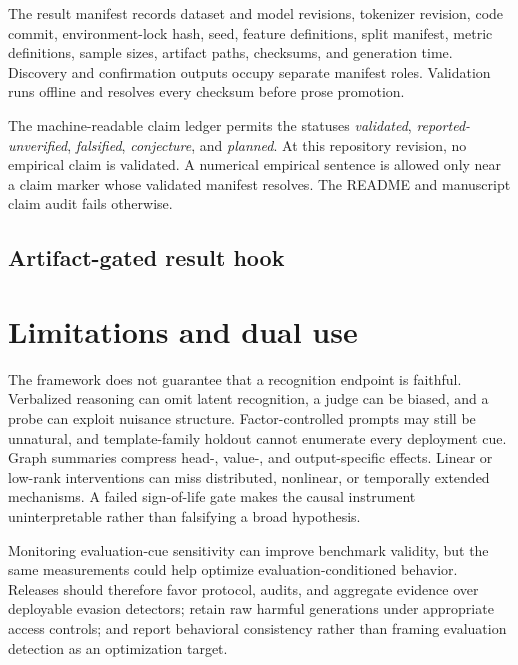 \documentclass[10pt]{article}
\begin{document}
The result manifest records dataset and model revisions, tokenizer revision, code commit, environment-lock hash, seed, feature definitions, split manifest, metric definitions, sample sizes, artifact paths, checksums, and generation time. Discovery and confirmation outputs occupy separate manifest roles. Validation runs offline and resolves every checksum before prose promotion.

The machine-readable claim ledger permits the statuses \emph{validated}, \emph{reported-unverified}, \emph{falsified}, \emph{conjecture}, and \emph{planned}. At this repository revision, no empirical claim is validated. A numerical empirical sentence is allowed only near a claim marker whose validated manifest resolves. The README and manuscript claim audit fails otherwise.

\subsection{Artifact-gated result hook}


\section{Limitations and dual use}

The framework does not guarantee that a recognition endpoint is faithful. Verbalized reasoning can omit latent recognition, a judge can be biased, and a probe can exploit nuisance structure. Factor-controlled prompts may still be unnatural, and template-family holdout cannot enumerate every deployment cue. Graph summaries compress head-, value-, and output-specific effects. Linear or low-rank interventions can miss distributed, nonlinear, or temporally extended mechanisms. A failed sign-of-life gate makes the causal instrument uninterpretable rather than falsifying a broad hypothesis.

Monitoring evaluation-cue sensitivity can improve benchmark validity, but the same measurements could help optimize evaluation-conditioned behavior. Releases should therefore favor protocol, audits, and aggregate evidence over deployable evasion detectors; retain raw harmful generations under appropriate access controls; and report behavioral consistency rather than framing evaluation detection as an optimization target.
\end{document}
